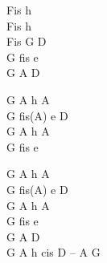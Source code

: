 \begin{chord}
Fis h\\
Fis h\\
Fis G D\\
G fis e\\
G A D

\OneColVin G A h A\\
\OneColVin G fis(A) e D\\
\OneColVin G A h A\\
\OneColVin G fis e

\OneColVin G A h A\\
\OneColVin G fis(A) e D\\
\OneColVin G A h A\\
\OneColVin G fis e\\
\OneColVin G A D\\
G A h cis D – A G
\end{chord}
